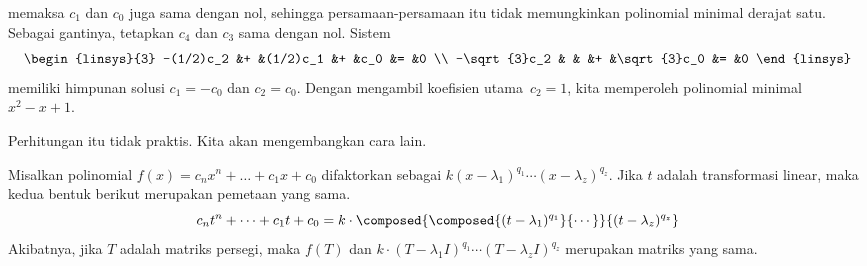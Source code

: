\begin{example}
memaksa \( c_1 \) dan \( c_0 \) juga sama dengan nol,
sehingga persamaan-persamaan itu tidak memungkinkan polinomial minimal derajat satu.
Sebagai gantinya, tetapkan \( c_4 \) dan \( c_3 \) sama dengan nol.
Sistem
\begin{equation*}
  \begin{linsys}{3}           
         -(1/2)c_2
         &+ &(1/2)c_1  
         &+  &c_0  &=  &0      \\
         -\sqrt{3}c_2
         &  &    
         &+ &\sqrt{3}c_0 &=  &0
   \end{linsys} 
\end{equation*}
memiliki himpunan solusi \( c_1=-c_0 \) dan \( c_2=c_0 \).
Dengan mengambil koefisien utama~\( c_2=1 \), kita memperoleh
polinomial minimal $x^2-x+1$.
\end{example}

Perhitungan itu tidak praktis.
Kita akan mengembangkan cara lain.

\begin{lemma} \label{le:PolyMapsFactor}
Misalkan polinomial \( f(x)=c_nx^n+\dots+c_1x+c_0 \) difaktorkan sebagai
\( k(x-\lambda_1)^{q_1}\cdots(x-\lambda_z)^{q_z} \).
Jika \( t \) adalah transformasi linear, maka kedua bentuk berikut merupakan pemetaan yang sama.
\begin{equation*}
  c_nt^n+\dots+c_1t+c_0
  =
  k\cdot\composed{\composed{(t-\lambda_1)^{q_1}}{\cdots}}{
      (t-\lambda_z)^{q_z}} 
\end{equation*}
Akibatnya, jika \( T \) adalah matriks persegi, maka \( f(T) \) dan
\( k\cdot(T-\lambda_1I)^{q_1}\cdots(T-\lambda_z I)^{q_z} \)
merupakan matriks yang sama.
\end{lemma}

